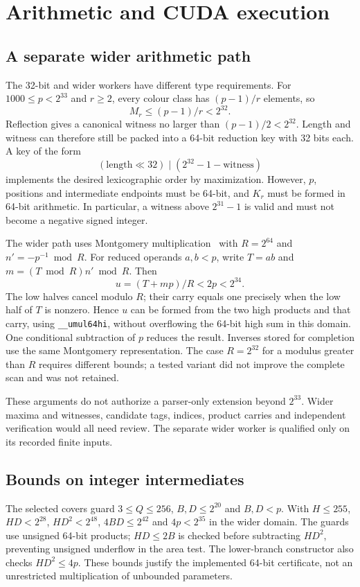 \documentclass[11pt]{article}
\theoremstyle{definition}\newtheorem{remark}[theorem]{Remark}
\begin{document}
\section{Arithmetic and CUDA execution}\label{sec:implementation}
\subsection{A separate wider arithmetic path}
The 32-bit and wider workers have different type requirements. For
$1000\le p<2^{33}$ and $r\ge2$, every colour class has $(p-1)/r$ elements,
so
\[
 M_r\le(p-1)/r<2^{32}.
\]
Reflection gives a canonical witness no larger than $(p-1)/2<2^{32}$.
Length and witness can therefore still be packed into a 64-bit reduction key
with 32 bits each. A key of the form
\[
 (\text{length}\ll32)\;|\;(2^{32}-1-\text{witness})
\]
implements the desired lexicographic order by maximization. However, $p$,
positions and intermediate endpoints must be 64-bit, and $K_r$ must be
formed in 64-bit arithmetic. In particular, a witness above $2^{31}-1$ is
valid and must not become a negative signed integer.

The wider path uses Montgomery multiplication~\cite{montgomery} with
$R=2^{64}$ and $n'=-p^{-1}\bmod R$. For reduced operands $a,b<p$, write
$T=ab$ and $m=(T\bmod R)n'\bmod R$. Then
\[
 u=(T+mp)/R<2p<2^{34}.
\]
The low halves cancel modulo $R$; their carry equals one precisely when
the low half of $T$ is nonzero. Hence $u$ can be formed from the two high
products and that carry, using \texttt{\_\_umul64hi}, without overflowing
the 64-bit high sum in this domain. One conditional subtraction of $p$
reduces the result. Inverses stored for completion use the same Montgomery
representation. The case $R=2^{32}$ for a modulus greater than $R$ requires
different bounds; a tested variant did not improve the complete scan and
was not retained.

These arguments do not authorize a parser-only extension beyond $2^{33}$.
Wider maxima and witnesses, candidate tags, indices, product carries and
independent verification would all need review. The separate wider worker is qualified only on its recorded finite inputs.

\subsection{Bounds on integer intermediates}\label{sec:types}
The selected covers guard $3\le Q\le256$, $B,D\le2^{20}$ and $B,D<p$.
With $H\le255$, $HD<2^{28}$, $HD^2<2^{48}$, $4BD\le2^{42}$ and
$4p<2^{35}$ in the wider domain. The guards use unsigned 64-bit products;
$HD\le2B$ is checked before subtracting $HD^2$, preventing unsigned
underflow in the area test. The lower-branch constructor also checks
$HD^2\le4p$. These bounds justify the implemented 64-bit certificate, not
an unrestricted multiplication of unbounded parameters.
\end{document}
